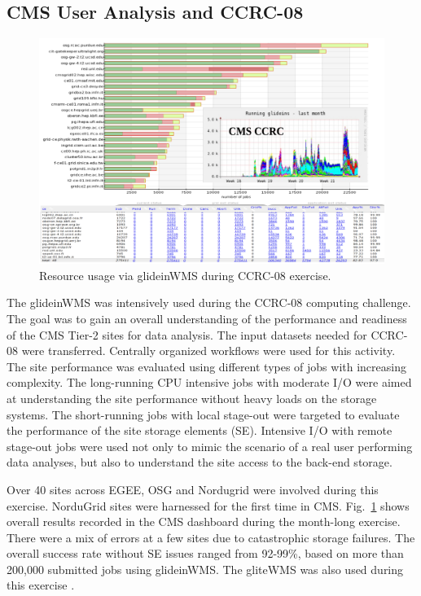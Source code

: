 \documentclass[a4paper]{jpconf}
\begin{document}
\subsection{CMS User Analysis and CCRC-08}
\begin{figure}
\begin{center}
\includegraphics[scale=0.55]{glideins_ccrc08}
\end{center}
\caption{Resource usage via glideinWMS during CCRC-08 exercise.}
\label{fig:glideins_ccrc}
\end{figure}
The glideinWMS was intensively used during the CCRC-08 computing challenge. The goal was to gain an overall understanding 
of the performance and readiness of the CMS Tier-2 sites for data analysis. The input datasets needed for CCRC-08 were transferred. 
Centrally organized workflows were used for this activity. The site performance
was evaluated using different types of jobs with increasing complexity. The long-running 
CPU intensive jobs with moderate I/O were aimed at understanding the site performance without
heavy loads on the storage systems. The short-running jobs with local stage-out were targeted
to evaluate the performance of the site storage elements (SE). Intensive I/O with remote stage-out
jobs were used not only to mimic the scenario of a real user performing data analyses, but also
to understand the site access to the back-end storage.

Over 40 sites across EGEE, OSG and Nordugrid were involved during this exercise. NorduGrid sites 
were harnessed for the first time in CMS. Fig.~\ref{fig:glideins_ccrc} shows overall results recorded in the CMS dashboard 
during the month-long exercise. There were a mix of errors at a few sites due to catastrophic storage 
failures. The overall success rate without SE issues ranged from 92-99\%, based on more than 200,000 
submitted jobs using glideinWMS. The gliteWMS was also used during this exercise \cite{bib:cms_glite}.
\end{document}
